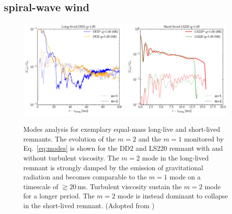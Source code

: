 \documentclass[11pt,a4paper,headinclude=true,DIV=14,BCOR=8mm,chapterprefix,listof=totoc,twoside,openright,abstracton]{scrbook}
\newcommand{\swind}{spiral-wave wind}
\begin{document}
\subsection{\swind{}}
\label{sec:spiralw}

\begin{figure}[t]
    \centering 
    \includegraphics[width=0.49\textwidth]{./figs/remnant/dens_modes/modes_rho_dd2.pdf}
    \includegraphics[width=0.49\textwidth]{./figs/remnant/dens_modes/modes_rho_ls220.pdf}
    \caption{Modes analysis for exemplary equal-mass long-live and short-lived
        remnants. The evolution of the $m=2$ and the $m=1$ monitored by
        Eq.~\eqref{eq:modes} is shown for the DD2 and LS220 remnant with and
        without turbulent viscosity. The $m=2$ mode in the long-lived
        remnant is strongly damped by the emission of gravitational
        radiation and becomes comparable to the $m=1$ mode on a timescale of
        ${\gtrsim}20\,$ms. Turbulent viscosity sustain the $m=2$ mode for
        a longer period. The $m=2$ mode is instead dominant to collapse in
        the short-lived remnant.
        (Adopted from \cite{Nedora:2020pak})
    }
    \label{fig:dens_modes}
\end{figure}
\end{document}
